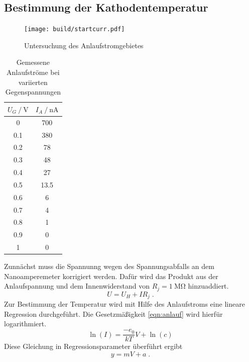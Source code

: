 \subsection{Bestimmung der Kathodentemperatur}
\begin{figure}
    \centering
    \caption{Untersuchung des Anlaufstromgebietes}
    \label{fig:startcurr}
    \texttt{[image: build/startcurr.pdf]}
\end{figure}
\begin{table}
    \centering
    \caption{Gemessene Anlaufströme bei variierten Gegenspannungen}
    \label{tab:anlauf}
    \begin{tabular}{S[table-format = 1.1] S[table-format = 3.1]}
        \toprule
        {$U_G \mathbin{/} \si{\volt}$} & {$I_A \mathbin{/} \si{\nano\ampere}$} \\
           & 700   \\
        0.1 & 380   \\
        0.2 & 78    \\
        0.3 & 48    \\
        0.4 & 27    \\
        0.5 & 13.5  \\
        0.6 & 6     \\
        0.7 & 4     \\
        0.8 & 1     \\
        0.9 & 0     \\
        1   & 0     \\
        \bottomrule
    \end{tabular}
\end{table}
Zunnächst muss die Spannunng wegen des Spannungsabfalls an dem Nanoamperemeter korrigiert werden.
Dafür wird das Produkt aus der Anlaufspannung und dem Innenwiderstand von $R_j = \SI{1}{\mega\ohm}$ hinzuaddiert.
\begin{equation}
    U = U_H + I R_j \; \text{.} \label{eqn:Korrektur}
\end{equation}
Zur Bestimmung der Temperatur wird mit Hilfe des Anlaufstroms eine lineare Regression durchgeführt. 
Die Gesetzmäßigkeit \eqref{eqn:anlauf} wird hierfür logarithmiert.
\begin{equation}
    \ln \left ( I \right ) = \frac{-e_0}{kT} V + \ln \left (c \right )
\end{equation}
Diese Gleichung in Regressionsparameter überführt ergibt
\begin{equation}
    y = mV + a \; \text{.}
\end{equation}
